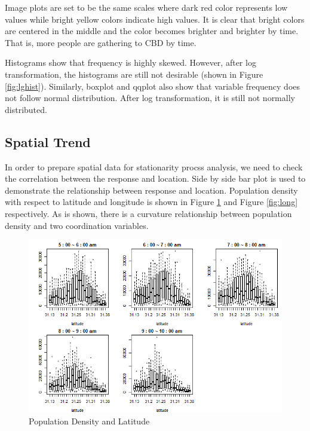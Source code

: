 \documentclass[hidelinks,12pt]{article}
\begin{document}
	Image plots are set to be the same scales where dark red color represents low values while bright yellow colors indicate high values. It is clear that bright colors are centered in the middle and the color becomes brighter and brighter by time. That is, more people are gathering to CBD by time.
	
	Histograms show that frequency is highly skewed. However, after log transformation, the histograms are still not desirable (shown in Figure \ref{fig:lghist}). Similarly, boxplot and qqplot also show that variable frequency does not follow normal distribution. After log transformation, it is still not normally distributed.

\subsection{Spatial Trend}\label{sec:spatialtrend}

In order to prepare spatial data for stationarity procss analysis, we need to check the correlation between the response and location. Side by side bar plot is used to demonstrate the relationship between response and location. Population density with respect to latitude and longitude is shown in Figure \ref{fig:lat} and Figure \ref{fig:long} respectively. As is shown, there is a curvature relationship between population density and two coordination variables. 

\begin{figure}[!ht]
		\includegraphics[width=\textwidth]{lat.png}
		\caption{Population Density and Latitude\label{fig:lat}}
\end{figure}
\FloatBarrier
\end{document}
